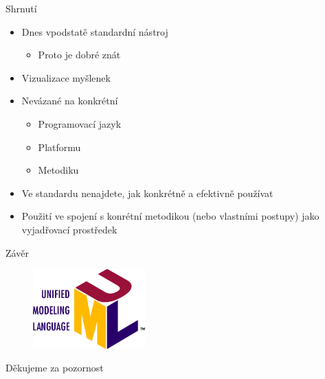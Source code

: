 
\begin{frame}{Shrnutí}

\begin{itemize}
	\item Dnes vpodstatě standardní nástroj
	\begin{itemize}
		\item Proto je dobré znát
	\end{itemize}
	\item Vizualizace myšlenek
	\item Nevázané na konkrétní
	\begin{itemize}
		\item Programovací jazyk
		\item Platformu
		\item Metodiku
	\end{itemize}
	\item Ve standardu nenajdete, jak konkrétně a efektivně používat
	\item Použití ve spojení s konrétní metodikou (nebo vlastními
	postupy) jako vyjadřovací prostředek
\end{itemize}

\end{frame}


\begin{frame}{Závěr}

\begin{figure}
	\includegraphics[width=43mm]{img/uml_logo.png}
\end{figure}

\bigskip

\begin{center}
	Děkujeme za pozornost
\end{center}

\end{frame}

